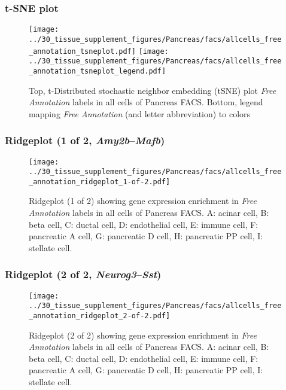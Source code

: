 \clearpage
\subsubsection{t-SNE plot}
\begin{figure}[h]
\centering
\texttt{[image: ../30\_tissue\_supplement\_figures/Pancreas/facs/allcells\_free\_annotation\_tsneplot.pdf]}
\texttt{[image: ../30\_tissue\_supplement\_figures/Pancreas/facs/allcells\_free\_annotation\_tsneplot\_legend.pdf]}
\caption{Top, t-Distributed stochastic neighbor embedding (tSNE) plot  \emph{Free Annotation} labels in all cells of Pancreas FACS. Bottom, legend mapping \emph{Free Annotation} (and letter abbreviation) to colors}
\end{figure}


\clearpage

\subsubsection{Ridgeplot (1 of 2, \emph{Amy2b}--\emph{Mafb})}
\begin{figure}[h]
\centering
\texttt{[image: ../30\_tissue\_supplement\_figures/Pancreas/facs/allcells\_free\_annotation\_ridgeplot\_1-of-2.pdf]}

\caption{ Ridgeplot (1 of 2)  showing gene expression enrichment in \emph{Free Annotation} labels in all cells of Pancreas FACS. A: acinar cell, B: beta cell, C: ductal cell, D: endothelial cell, E: immune cell, F: pancreatic A cell, G: pancreatic D cell, H: pancreatic PP cell, I: stellate cell.}
\end{figure}


\clearpage

\subsubsection{Ridgeplot (2 of 2, \emph{Neurog3}--\emph{Sst})}
\begin{figure}[h]
\centering
\texttt{[image: ../30\_tissue\_supplement\_figures/Pancreas/facs/allcells\_free\_annotation\_ridgeplot\_2-of-2.pdf]}

\caption{ Ridgeplot (2 of 2)  showing gene expression enrichment in \emph{Free Annotation} labels in all cells of Pancreas FACS. A: acinar cell, B: beta cell, C: ductal cell, D: endothelial cell, E: immune cell, F: pancreatic A cell, G: pancreatic D cell, H: pancreatic PP cell, I: stellate cell.}
\end{figure}


